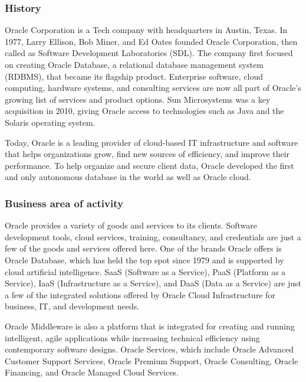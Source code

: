 \subsubsection{History}
Oracle Corporation is a Tech company with headquarters in Austin, Texas. In 1977, Larry Ellison, Bob Miner, and Ed Oates founded Oracle Corporation, then called as Software Development Laboratories (SDL). The company first focused on creating Oracle Database, a relational database management system (RDBMS), that became its flagship product. Enterprise software, cloud computing, hardware systems, and consulting services are now all part of Oracle's growing list of services and product options. Sun Microsystems was a key acquisition in 2010, giving Oracle access to technologies such as Java and the Solaris operating system.\cite{O-History}\mynewline

Today, Oracle is a leading provider of cloud-based IT infrastructure and software that helps organizations grow, find new sources of efficiency, and improve their performance. To help organize and secure client data, Oracle developed the first and only autonomous database in the world as well as Oracle cloud.

\subsubsection{Business area of activity}
Oracle provides a variety of goods and services to its clients. Software development tools, cloud services, training, consultancy, and credentials are just a few of the goods and services offered here. One of the brands Oracle offers is Oracle Database, which has held the top spot since 1979 and is supported by cloud artificial intelligence. SaaS (Software as a Service), PaaS (Platform as a Service), IaaS (Infrastructure as a Service), and DaaS (Data as a Service) are just a few of the integrated solutions offered by Oracle Cloud Infrastructure for business, IT, and development needs.\mynewline

Oracle Middleware is also a platform that is integrated for creating and running intelligent, agile applications while increasing technical efficiency using contemporary software designs. Oracle Services, which include Oracle Advanced Customer Support Services, Oracle Premium Support, Oracle Consulting, Oracle Financing, and Oracle Managed Cloud Services.

